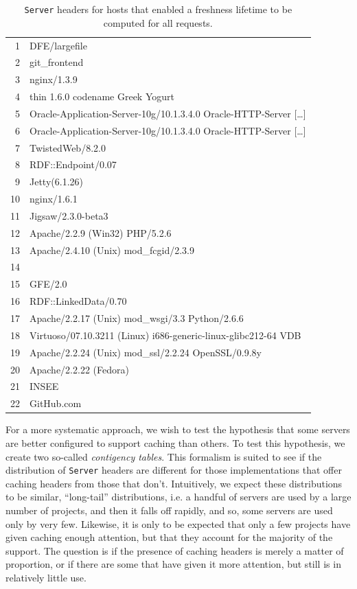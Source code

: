 \documentclass{llncs}
\newcommand{\httph}[1]{\texttt{#1}}
\begin{document}
\begin{table}[hb]
  \caption{\httph{Server} headers for hosts that enabled a freshness
    lifetime to be computed for all requests.}\label{tab:servers}
\begin{center}
\begin{tabular}{rl}
  \hline
1 & DFE/largefile \\ 
  2 & git\_frontend \\ 
  3 & nginx/1.3.9 \\ 
  4 & thin 1.6.0 codename Greek Yogurt \\ 
  5 & Oracle-Application-Server-10g/10.1.3.4.0 Oracle-HTTP-Server [\ldots]\\
  6 & Oracle-Application-Server-10g/10.1.3.4.0 Oracle-HTTP-Server [\ldots]\\
  7 & TwistedWeb/8.2.0 \\ 
  8 & RDF::Endpoint/0.07 \\ 
  9 & Jetty(6.1.26) \\ 
  10 & nginx/1.6.1 \\ 
  11 & Jigsaw/2.3.0-beta3 \\ 
  12 & Apache/2.2.9 (Win32) PHP/5.2.6 \\ 
  13 & Apache/2.4.10 (Unix) mod\_fcgid/2.3.9 \\ 
  14 &  \\ 
  15 & GFE/2.0 \\ 
  16 & RDF::LinkedData/0.70 \\ 
  17 & Apache/2.2.17 (Unix) mod\_wsgi/3.3 Python/2.6.6 \\ 
  18 & Virtuoso/07.10.3211 (Linux) i686-generic-linux-glibc212-64  VDB \\ 
  19 & Apache/2.2.24 (Unix) mod\_ssl/2.2.24 OpenSSL/0.9.8y \\ 
  20 & Apache/2.2.22 (Fedora) \\ 
  21 & INSEE \\ 
  22 & GitHub.com \\ 
   \hline
\end{tabular}
\end{center}
\end{table}

For a more systematic approach, we wish to test the hypothesis that
some servers are better configured to support caching than others. To
test this hypothesis, we create two so-called \emph{contigency
  tables}\cite{kn:bj}. This formalism is suited to see if the
distribution of  \httph{Server} headers are different for those implementations that
offer caching headers from those that don't. Intuitively, we expect
these distributions to be similar, ``long-tail'' distributions, i.e. a
handful of servers are used by a large number of projects, and then it
falls off rapidly, and so, some servers are used only by very
few. Likewise, it is only to be expected that only a few projects have
given caching enough attention, but that they account for the majority
of the support. The question is if the presence of caching headers is
merely a matter of proportion, or if there are some that have given it
more attention, but still is in relatively little use.
\end{document}
